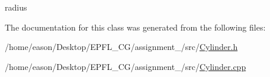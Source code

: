 radius 



The documentation for this class was generated from the following files\+:\begin{DoxyCompactItemize}
\item 
/home/eason/\+Desktop/\+E\+P\+F\+L\+\_\+\+C\+G/assignment\+\_/src/\hyperlink{Cylinder_8h}{Cylinder.\+h}\item 
/home/eason/\+Desktop/\+E\+P\+F\+L\+\_\+\+C\+G/assignment\+\_/src/\hyperlink{Cylinder_8cpp}{Cylinder.\+cpp}\end{DoxyCompactItemize}
